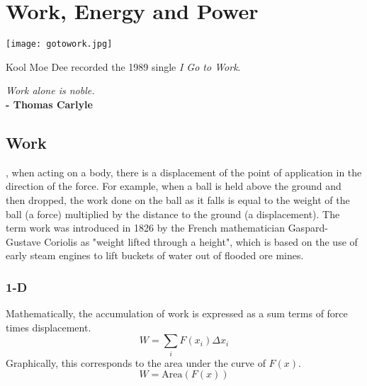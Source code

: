 
\chapter{Work, Energy and Power}
\begin{marginfigure}%
  \texttt{[image: gotowork.jpg]}
  \caption{Kool Moe Dee recorded the 1989 single \textit{I Go to Work}.}
  \label{fig:marginfig}
\end{marginfigure}
\textit{Work alone is noble.}  \\
\noindent\textbf{-   Thomas Carlyle}

\vspace{1cm}

\section{Work}


, when acting on a body, there is a displacement of the point of application in the direction of the force.
 For example, when a ball is held above the ground and then dropped, the work done on the ball as it falls is equal to the weight of the ball (a force) multiplied by the distance to the ground (a displacement).  The term work was introduced in 1826 by the French mathematician Gaspard-Gustave Coriolis as "weight lifted through a height", which is based on the use of early steam engines to lift buckets of water out of flooded ore mines.

\subsection{1-D}
Mathematically, the accumulation of work is expressed as a sum terms of force times displacement.  
$$W=\sum_i F(x_i) \Delta{x}_i$$
Graphically, this corresponds to the area under the curve of $F(x)$.
$$W=\text{Area}(F(x))$$

